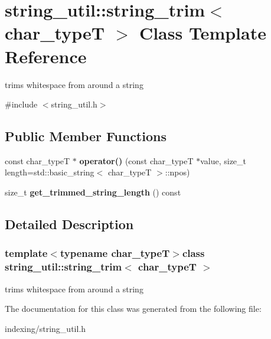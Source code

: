 \hypertarget{classstring__util_1_1string__trim}{\section{string\-\_\-util\-:\-:string\-\_\-trim$<$ char\-\_\-type\-T $>$ Class Template Reference}
\label{classstring__util_1_1string__trim}
}


trims whitespace from around a string  




{\ttfamily \#include $<$string\-\_\-util.\-h$>$}

\subsection*{Public Member Functions}
\begin{DoxyCompactItemize}
\item 
\hypertarget{classstring__util_1_1string__trim_a33ce709a5bd7a1fd2d974a0940fc1ff8}{const char\-\_\-type\-T $\ast$ {\bfseries operator()} (const char\-\_\-type\-T $\ast$value, size\-\_\-t length=std\-::basic\-\_\-string$<$ char\-\_\-type\-T $>$\-::npos)}\label{classstring__util_1_1string__trim_a33ce709a5bd7a1fd2d974a0940fc1ff8}

\item 
\hypertarget{classstring__util_1_1string__trim_abea837c5d6ef343a91b161d039162ecb}{size\-\_\-t {\bfseries get\-\_\-trimmed\-\_\-string\-\_\-length} () const }\label{classstring__util_1_1string__trim_abea837c5d6ef343a91b161d039162ecb}

\end{DoxyCompactItemize}


\subsection{Detailed Description}
\subsubsection*{template$<$typename char\-\_\-type\-T$>$class string\-\_\-util\-::string\-\_\-trim$<$ char\-\_\-type\-T $>$}

trims whitespace from around a string 

The documentation for this class was generated from the following file\-:\begin{DoxyCompactItemize}
\item 
indexing/string\-\_\-util.\-h\end{DoxyCompactItemize}
